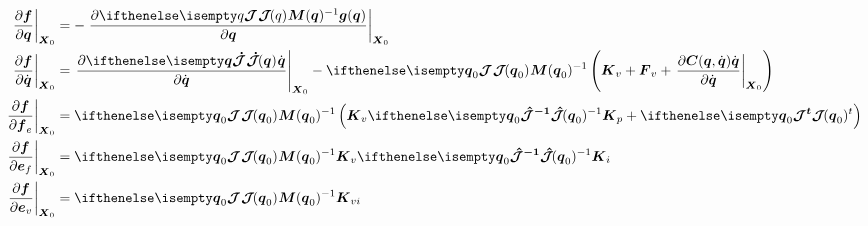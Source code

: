 \documentclass[12pt, a4paper]{article} %
\numberwithin{equation}{section}
\begin{document}
	\begin{equation}
	\begin{split}
	\left. \frac{\partial \vect{f}}{\partial \vect{q} } \right|_{\matr{X}_0} &= - \left. \frac{\partial \jacobian{q}{}{} \matr{M}(\vect{q})^{-1} \vect{g}(\vect{q}) }{\partial \vect{q} } \right|_{\matr{X}_0} \\
	\left. \frac{\partial \vect{f}}{\partial \dot{\vect{q}} } \right|_{\matr{X}_0} &= \left. \frac{\partial \jacobianDot{\vect{q}}{}{} \dot{\vect{q}} }{\partial \dot{\vect{q}} } \right|_{\matr{X}_0} - \jacobian{\vect{q}_0}{}{}\matr{M}(\vect{q}_0)^{-1} \left(\matr{K}_v + \matr{F}_v + \left. \frac{\partial \matr{C}(\vect{q},\dot{\vect{q}}) \dot{\vect{q}} }{\partial \dot{\vect{q}} } \right|_{\matr{X}_0} \right) \\
	\left. \frac{\partial \vect{f}}{\partial \vect{f}_e } \right|_{\matr{X}_0} &= \jacobian{\vect{q}_0
	}{}{}\matr{M}(\vect{q}_0)^{-1} \left( \matr{K}_v \jacobianHat{\vect{q}_0}{}{-1} \matr{K}_p + \jacobian{\vect{q}_0}{}{t} \right) \\
	\left. \frac{\partial \vect{f}}{\partial \vect{e}_f } \right|_{\matr{X}_0} &= \jacobian{\vect{q}_0
	}{}{}\matr{M}(\vect{q}_0)^{-1} \matr{K}_v\jacobianHat{\vect{q}_0}{}{-1}\matr{K}_i \\
	\left. \frac{\partial \vect{f}}{\partial \vect{e}_v } \right|_{\matr{X}_0} &= \jacobian{\vect{q}_0
	}{}{}\matr{M}(\vect{q}_0)^{-1} \matr{K}_{vi} \\
	\end{split}
	\end{equation}
\end{document}
